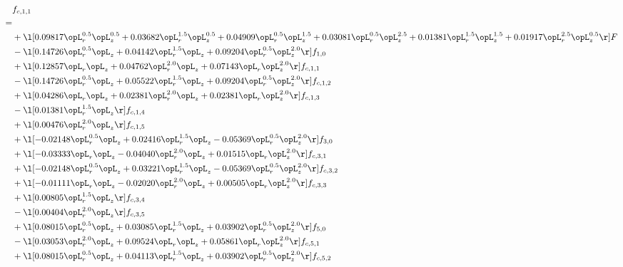 \begin{alignat}{2} 
\label{eq:f_11_1} 
& f_{c,1,1} \nonumber \\ 
 = \\ 
& + \l[  0.09817 \opL_r^{0.5} \opL_z^{0.5} +  0.03682 \opL_r^{1.5} \opL_z^{0.5} +  0.04909 \opL_r^{0.5} \opL_z^{1.5} +  0.03081 \opL_r^{0.5} \opL_z^{2.5} +  0.01381 \opL_r^{1.5} \opL_z^{1.5} +  0.01917 \opL_r^{2.5} \opL_z^{0.5}  \r] F \nonumber \\ 
& - \l[  0.14726 \opL_r^{0.5} \opL_z +  0.04142 \opL_r^{1.5} \opL_z +  0.09204 \opL_r^{0.5} \opL_z^{2.0}  \r] f_{1,0} \nonumber \\ 
& + \l[  0.12857 \opL_r \opL_z +  0.04762 \opL_r^{2.0} \opL_z +  0.07143 \opL_r \opL_z^{2.0}  \r] f_{c,1,1} \nonumber \\ 
& - \l[  0.14726 \opL_r^{0.5} \opL_z +  0.05522 \opL_r^{1.5} \opL_z +  0.09204 \opL_r^{0.5} \opL_z^{2.0}  \r] f_{c,1,2} \nonumber \\ 
& + \l[  0.04286 \opL_r \opL_z +  0.02381 \opL_r^{2.0} \opL_z +  0.02381 \opL_r \opL_z^{2.0}  \r] f_{c,1,3} \nonumber \\ 
& - \l[  0.01381 \opL_r^{1.5} \opL_z  \r] f_{c,1,4} \nonumber \\ 
& + \l[  0.00476 \opL_r^{2.0} \opL_z  \r] f_{c,1,5} \nonumber \\ 
& + \l[  -0.02148 \opL_r^{0.5} \opL_z +  0.02416 \opL_r^{1.5} \opL_z   -0.05369 \opL_r^{0.5} \opL_z^{2.0}  \r] f_{3,0} \nonumber \\ 
& + \l[  -0.03333 \opL_r \opL_z   -0.04040 \opL_r^{2.0} \opL_z +  0.01515 \opL_r \opL_z^{2.0}  \r] f_{c,3,1} \nonumber \\ 
& + \l[  -0.02148 \opL_r^{0.5} \opL_z +  0.03221 \opL_r^{1.5} \opL_z   -0.05369 \opL_r^{0.5} \opL_z^{2.0}  \r] f_{c,3,2} \nonumber \\ 
& + \l[  -0.01111 \opL_r \opL_z   -0.02020 \opL_r^{2.0} \opL_z +  0.00505 \opL_r \opL_z^{2.0}  \r] f_{c,3,3} \nonumber \\ 
& + \l[  0.00805 \opL_r^{1.5} \opL_z  \r] f_{c,3,4} \nonumber \\ 
& - \l[  0.00404 \opL_r^{2.0} \opL_z  \r] f_{c,3,5} \nonumber \\ 
& + \l[  0.08015 \opL_r^{0.5} \opL_z +  0.03085 \opL_r^{1.5} \opL_z +  0.03902 \opL_r^{0.5} \opL_z^{2.0}  \r] f_{5,0} \nonumber \\ 
& - \l[  0.03053 \opL_r^{2.0} \opL_z +  0.09524 \opL_r \opL_z +  0.05861 \opL_r \opL_z^{2.0}  \r] f_{c,5,1} \nonumber \\ 
& + \l[  0.08015 \opL_r^{0.5} \opL_z +  0.04113 \opL_r^{1.5} \opL_z +  0.03902 \opL_r^{0.5} \opL_z^{2.0}  \r] f_{c,5,2} \nonumber \\ 

\end{alignat}

